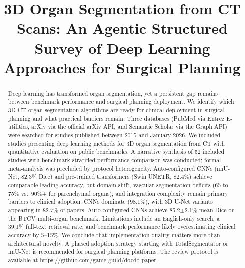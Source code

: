 \documentclass[conference]{IEEEtran}
\begin{document}
\title{3D Organ Segmentation from CT Scans: An Agentic Structured Survey of Deep Learning Approaches for Surgical Planning}

\author{
}

\maketitle

\begin{abstract}
Deep learning has transformed organ segmentation, yet a persistent gap remains between benchmark performance and surgical planning deployment. We identify which 3D CT organ segmentation algorithms are ready for clinical deployment in surgical planning and what practical barriers remain. Three databases (PubMed via Entrez E-utilities, arXiv via the official arXiv API, and Semantic Scholar via the Graph API) were searched for studies published between 2015 and January 2026. We included studies presenting deep learning methods for 3D organ segmentation from CT with quantitative evaluation on public benchmarks. A narrative synthesis of 52 included studies with benchmark-stratified performance comparison was conducted; formal meta-analysis was precluded by protocol heterogeneity. Auto-configured CNNs (nnU-Net, 82.3\% Dice) and pre-trained transformers (Swin UNETR, 82.4\%) achieve comparable leading accuracy, but domain shift, vascular segmentation deficits (65 to 75\% vs.\ 90\%+ for parenchymal organs), and integration complexity remain primary barriers to clinical adoption. CNNs dominate (98.1\%), with 3D U-Net variants appearing in 82.7\% of papers. Auto-configured CNNs achieve 85.2$\pm$2.1\% mean Dice on the BTCV multi-organ benchmark. Limitations include an English-only search, a 39.1\% full-text retrieval rate, and benchmark performance likely overestimating clinical accuracy by 5--15\%. We conclude that implementation quality matters more than architectural novelty. A phased adoption strategy starting with TotalSegmentator or nnU-Net is recommended for surgical planning platforms. The review protocol is available at \url{https://github.com/game-guild/docdo-paper}.
\end{abstract}
\end{document}
